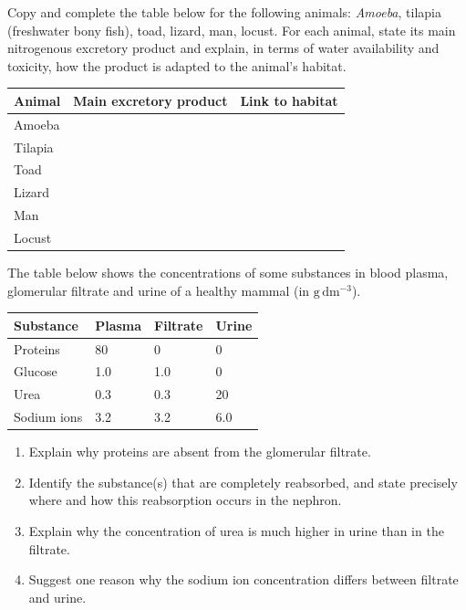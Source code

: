\documentclass[11pt]{article}
\newcounter{popsec}
\newcounter{popsub}
\newcommand{\courssub}[1]{%
  \stepcounter{popsub}%
  \par\vspace{9pt}\noindent{\popxbold\fontsize{11.5}{13}\selectfont\color{popink}{\color{poporange}\thepopsec.\thepopsub}\hspace{6pt}#1}\par\nopagebreak\vspace{4pt}
}
\begin{document}
\courssub{I practise}

\begin{exercice}
Copy and complete the table below for the following animals: \emph{Amoeba}, tilapia (freshwater bony fish), toad, lizard, man, locust. For each animal, state its main nitrogenous excretory product and explain, in terms of water availability and toxicity, how the product is adapted to the animal's habitat.
\begin{center}
\begin{tabularx}{\linewidth}{|l|X|X|}
\hline
\rowcolor{popblueL} \textbf{Animal} & \textbf{Main excretory product} & \textbf{Link to habitat} \\
\hline
Amoeba & & \\
\hline
Tilapia & & \\
\hline
Toad & & \\
\hline
Lizard & & \\
\hline
Man & & \\
\hline
Locust & & \\
\hline
\end{tabularx}
\end{center}
\end{exercice}

\begin{exercice}
The table below shows the concentrations of some substances in blood plasma, glomerular filtrate and urine of a healthy mammal (in $\mathrm{g\,dm^{-3}}$).
\begin{center}
\begin{tabularx}{\linewidth}{|l|X|X|X|}
\hline
\rowcolor{popblueL} \textbf{Substance} & \textbf{Plasma} & \textbf{Filtrate} & \textbf{Urine} \\
\hline
Proteins & 80 & 0 & 0 \\
\hline
Glucose & 1.0 & 1.0 & 0 \\
\hline
Urea & 0.3 & 0.3 & 20 \\
\hline
Sodium ions & 3.2 & 3.2 & 6.0 \\
\hline
\end{tabularx}
\end{center}
\begin{enumerate}
\item Explain why proteins are absent from the glomerular filtrate.
\item Identify the substance(s) that are completely reabsorbed, and state precisely where and how this reabsorption occurs in the nephron.
\item Explain why the concentration of urea is much higher in urine than in the filtrate.
\item Suggest one reason why the sodium ion concentration differs between filtrate and urine.
\end{enumerate}
\end{exercice}
\end{document}
